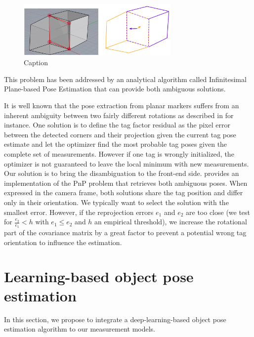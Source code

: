 \begin{figure}
    \centering
    \includegraphics[width=0.7\textwidth]{figures/tag_ambiguity.png}
    \caption{Caption}
    \label{fig:tag_ambiguity}
\end{figure}


This problem has been addressed by an analytical algorithm called Infinitesimal Plane-based Pose Estimation \cite{collins2014infinitesimal} that can 
provide both ambiguous solutions.

It is well known that the pose extraction from planar markers suffers from an inherent ambiguity between two fairly different rotations as described in 
\cite{8206468} for instance. One solution is to define the tag factor residual as the pixel error between the detected corners and their projection given the
current tag pose estimate and let the optimizer find the most probable tag poses given the complete set of measurements. However if one tag is wrongly initialized, 
the optimizer is not guaranteed to leave the local minimum with new measurements. Our solution is to bring the disambiguation to the front-end side.
\cite{collins2014infinitesimal} provides an implementation of the PnP problem that retrieves both ambiguous poses. When expressed in the camera frame, 
both solutions share the tag position and differ only in their orientation. We typically want to select the solution with the smallest error. 
However, if the reprojection errors $e_1$ and $e_2$ are too close (we test for $\tfrac{e_2}{e_1} < h$ with $e_1 \leq e_2$ and $h$ an empirical threshold), 
we increase the rotational part of the covariance matrix by a great factor to prevent a potential wrong tag orientation to influence the estimation.










%
%
%
%
\section{Learning-based object pose estimation}
In this section, we propose to integrate a deep-learning-based object pose estimation algorithm \cite{labbe2020cosypose} to our measurement models. 


